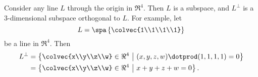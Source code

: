 
\begin{example}
Consider any line \(L\) through the origin in \(\Re^4\). Then \(L\) is a subspace, and \(L^\perp\) is a \(3\)-dimensional subspace orthogonal to \(L\). For example, let 
\[L=\spa \left\{ \colvec{1\\1\\1\\1} \right\}\] 
be a line in \(\Re^4.\) Then 
\begin{align*}
L^\perp&=\left \{  \colvec{x\\y\\z\\w} \in \Re^4 ~\middle| ~ (x,y,z,w) \dotprod (1,1,1,1)=0 \right\} \\
&=\left\{ \colvec{x\\y\\z\\w} \in \Re^4 ~\middle| ~ x+y+z+w=0 \right \}.
\end{align*}


\end{example}
